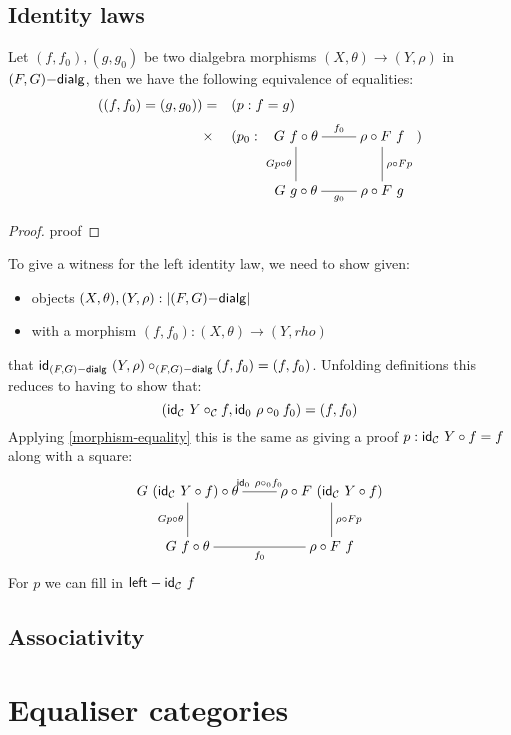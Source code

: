 \subsection{Identity laws}

\begin{proposition}
  \label{morphism-equality}
  Let $(f,f_0),(g,g_0)$ be two dialgebra morphisms
  $(X,\theta) \to (Y,\rho)$ in $(F,G)\mathsf{-dialg}$, then we have the
  following equivalence of equalities:
  \begin{align*}
    ((f,f_0) = (g,g_0)) &= &&(p : f = g)\\
    &\times &&(p_0 : 
              \xymatrix{
              G\ f \circ \theta
              \ar@{-}[r]^{f_0}
              \ar@{-}[d]_{G p \circ \theta}
              &\rho \circ F\ f
              \ar@{-}[d]^{\rho \circ F p}
              \\
              G\ g \circ \theta
              \ar@{-}[r]_{g_0}
              &\rho \circ F\ g
              })
  \end{align*}
\end{proposition}

\begin{proof}
  proof
\end{proof}

To give a witness for the left identity law, we need to show given:
\begin{itemize}
\item objects $(X,\theta), (Y,\rho) : |(F,G)\mathsf{-dialg}|$
\item with a morphism $(f,f_0) : (X,\theta) \to (Y,rho)$
\end{itemize}
that $\mathsf{id}_{(F,G)\mathsf{-dialg}}\ (Y,\rho) \circ_{(F,G)\mathsf{-dialg}} (f,f_0) = (f,f_0)$. Unfolding definitions this reduces to having to show that:
$$
(\mathsf{id}_{\mathcal{C}}\ Y \circ_{\mathcal{C}} f , \mathsf{id}_0\ \rho \circ_0 f_0) = (f,f_0)
$$
Applying \cref{morphism-equality} this is the same as giving a proof $p : \mathsf{id}_{\mathcal{C}}\ Y \circ f = f$ along with a square:
$$
\xymatrix{
              G\ (\id_{\Cc}\ Y \circ f) \circ \theta
              \ar@{-}[r]^{\id_0\ \rho \circ_0 f_0}
              \ar@{-}[d]_{G p \circ \theta}
              &\rho \circ F\ (\id_{\Cc}\ Y \circ f)
              \ar@{-}[d]^{\rho \circ F p}
              \\
              G\ f \circ \theta
              \ar@{-}[r]_{f_0}
              &\rho \circ F\ f
              }
$$
For $p$ we can fill in $\mathsf{left-id}_{\mathcal{C}}\ f$


\subsection{Associativity}

\section{Equaliser categories}

